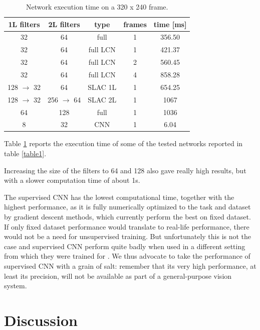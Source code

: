 \documentclass{article} %
\begin{document}
\begin{table}[htdp]
\caption{Network execution time on a 320 x 240 frame.}
\begin{center}
\begin{tabular}{|c|c|c|c|c|}
\hline\hline
1L filters	& 2L filters	& type				& frames 		&time [ms] \\ 
\hline
32 		& 64 			& full					& 1			& 356.50 \\
32 		& 64 			& full LCN				& 1			& 421.37 \\
32 		& 64 			& full	 LCN				& 2			& 560.45 \\
32 		& 64 			& full	 LCN				& 4			& 858.28 \\
128 $\rightarrow$ 32 	& 64 			& SLAC 1L			& 1			& 654.25 \\
128 $\rightarrow$ 32 	& 256 $\rightarrow$ 64 	& SLAC 2L			& 1			& 1067 \\	
64		& 128		& full					& 1			& 1036 \\
8		& 32			& CNN				& 1			& 6.04 \\

\hline\hline
\end{tabular}
\end{center}
\label{table2}
\end{table}

Table \ref{table2} reports the execution time of some of the tested networks reported in table \ref{table1}.

Increasing the size of the filters to 64 and 128 also gave really high results, but with a slower computation time of about 1s.

The supervised CNN has the lowest computational time, together with the highest performance, as it is fully numerically optimized to the task and dataset by gradient descent methods, which currently perform the best on fixed dataset. If only fixed dataset performance would translate to real-life performance, there would not be a need for unsupervised training. But unfortunately this is not the case and  supervised CNN perform quite badly when used in a different setting from which they were trained for \cite{ec_cl_paper1}. We thus advocate to take the performance of  supervised CNN with a grain of salt: remember that its very high performance, at least its precision, will not be available as part of a general-purpose vision system.



\section{Discussion}
\end{document}
